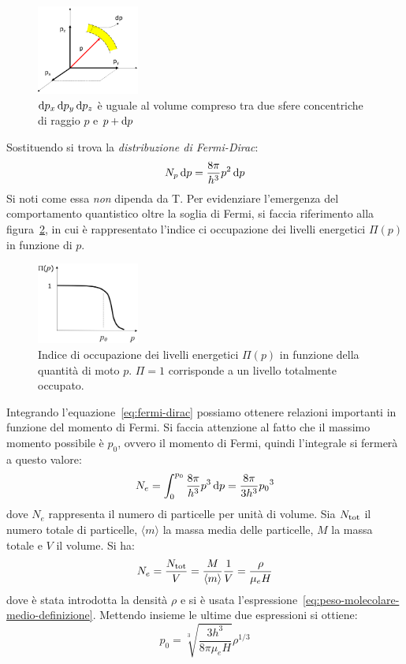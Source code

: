 \begin{figure}
\centering
\includegraphics[width=0.3\textwidth]{immagini/volume-infinitesimo-sfera.png}
\caption{$\mathop{\mathrm{{}d}}\mathopen{} p_x \mathop{\mathrm{{}d}}\mathopen{} p_y \mathop{\mathrm{{}d}}\mathopen{} p_z$ è uguale al volume compreso tra due sfere concentriche di raggio $p$ e $p + \mathop{\mathrm{{}d}}\mathopen{} p$}
\label{fig:volume-infinitesimo-sfera}
\end{figure}

Sostituendo si trova la \emph{distribuzione di Fermi-Dirac}:
\begin{equation}\label{eq:fermi-dirac}
    N_p \mathop{\mathrm{{}d}}\mathopen{} p = \frac{8 \pi}{h^3} p^2 \mathop{\mathrm{{}d}}\mathopen{} p
\end{equation}
Si noti come essa \emph{non} dipenda da T. Per evidenziare l'emergenza del comportamento quantistico oltre la soglia di Fermi, si faccia riferimento alla figura~\ref{fig:distribuzione-fermi}, in cui è rappresentato l'indice ci occupazione dei livelli energetici $\Pi(p)$ in funzione di $p$.

\begin{figure}
\centering
\includegraphics[width=0.3\textwidth]{immagini/distribuzione-fermi.png}
\caption{Indice di occupazione dei livelli energetici $\Pi(p)$ in funzione della quantità di moto $p$. $\Pi = 1$ corrisponde a un livello totalmente occupato.}
\label{fig:distribuzione-fermi}
\end{figure}

Integrando l'equazione~\eqref{eq:fermi-dirac} possiamo ottenere relazioni importanti in funzione del momento di Fermi. Si faccia attenzione al fatto che il massimo momento possibile è $p_0$, ovvero il momento di Fermi, quindi l'integrale si fermerà a questo valore:
\[
N_e = \int_0^{p_0} \frac{8 \pi}{h^3} p^3 \mathop{\mathrm{{}d}}\mathopen{} p = \frac{8\pi}{3h^3} {p_0}^3
\]
dove $N_e$ rappresenta il numero di particelle per unità di volume. Sia $N_\textup{tot}$ il numero totale di particelle, $\langle m \rangle$ la massa media delle particelle, $M$ la massa totale e $V$ il volume. Si ha:
\[
N_e = \frac{N_\textup{tot}}{V} = \frac{M}{\langle m \rangle} \frac{1}{V} = \frac{\rho}{\mu_e H}
\]
dove è stata introdotta la densità $\rho$ e si è usata l'espressione~\eqref{eq:peso-molecolare-medio-definizione}.
Mettendo insieme le ultime due espressioni si ottiene:
\begin{equation}\label{eq:relazione-momento-fermi-densità}
    p_0 = \sqrt[3]{\dfrac{3h^3}{8\pi \mu_e H}} \rho^{1/3}
\end{equation}

